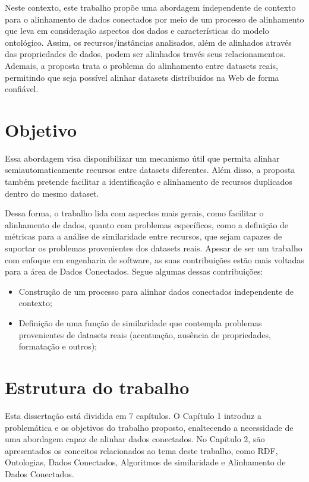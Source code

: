 Neste contexto, este trabalho propõe uma abordagem independente de contexto para o alinhamento de dados conectados por meio de um processo de alinhamento que leva em consideração aspectos dos dados e  características do modelo ontológico. Assim, os recursos/instâncias analisados, além de alinhados através das propriedades de dados, podem ser alinhados través seus relacionamentos. Ademais, a proposta trata o problema do alinhamento entre datasets reais, permitindo que seja possível alinhar datasets distribuídos na Web de forma confiável.
\section{Objetivo}

Essa abordagem visa disponibilizar um mecanismo útil que permita alinhar semiautomaticamente recursos entre datasets diferentes. Além disso, a proposta também pretende facilitar a identificação e alinhamento de recursos duplicados dentro do mesmo dataset.

Dessa forma, o trabalho lida com aspectos mais gerais, como facilitar o alinhamento de dados, quanto com problemas específicos, como a definição de métricas para a análise de similaridade entre recursos, que sejam capazes de suportar os problemas provenientes dos datasets reais. Apesar de ser um trabalho com enfoque em engenharia de software, as suas contribuições estão mais voltadas para a área de Dados Conectados. Segue algumas dessas contribuições:

\begin{itemize}
	\item Construção de um processo para alinhar dados conectados independente de contexto;
	\item Definição de uma função de similaridade que contempla problemas provenientes de datasets reais (acentuação, ausência de propriedades, formatação e outros);
\end{itemize}

\section{Estrutura do trabalho}

Esta dissertação está dividida em 7 capítulos. O Capítulo 1 introduz a problemática e os objetivos do trabalho proposto, enaltecendo a necessidade de uma abordagem capaz de alinhar dados conectados. No Capítulo 2, são apresentados os conceitos relacionados ao tema deste trabalho, como RDF, Ontologias, Dados Conectados, Algoritmos de similaridade e Alinhamento de Dados Conectados.

